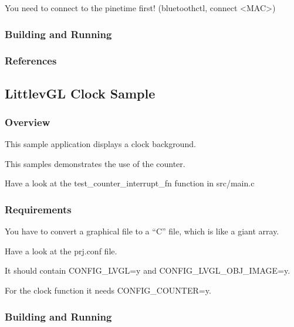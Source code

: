 \documentclass[letterpaper,10pt,english]{sphinxmanual}
\begin{document}
You need to connect to the pinetime first!
(bluetoothctl, connect \textless{}MAC\textgreater{})


\subsubsection{Building and Running}
\label{\detokenize{samples/gui/clock-cts/README:building-and-running}}

\subsubsection{References}
\label{\detokenize{samples/gui/clock-cts/README:references}}

\subsection{LittlevGL Clock Sample}
\label{\detokenize{samples/gui/clock/README:littlevgl-clock-sample}}\label{\detokenize{samples/gui/clock/README:clock-sample}}\label{\detokenize{samples/gui/clock/README::doc}}

\subsubsection{Overview}
\label{\detokenize{samples/gui/clock/README:overview}}
This sample application displays a clock background.

This samples demonstrates the use of the counter.

Have a look at the test\_counter\_interrupt\_fn function in src/main.c


\subsubsection{Requirements}
\label{\detokenize{samples/gui/clock/README:requirements}}
You have to convert a graphical file to a “C” file, which is like a giant array.

Have a look at the prj.conf file.

It should contain CONFIG\_LVGL=y and
CONFIG\_LVGL\_OBJ\_IMAGE=y.

For the clock function it needs  CONFIG\_COUNTER=y.


\subsubsection{Building and Running}
\label{\detokenize{samples/gui/clock/README:building-and-running}}
\end{document}
